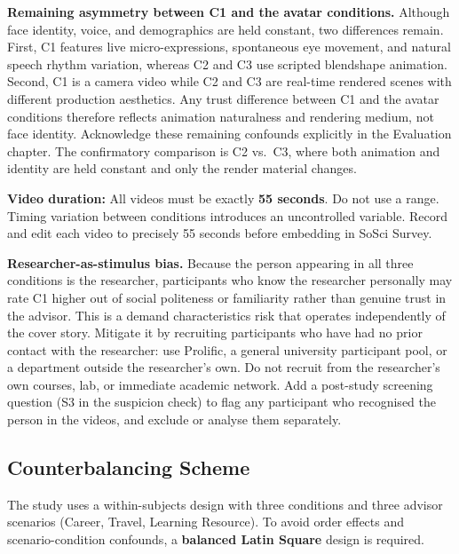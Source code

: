\documentclass[11pt, a4paper]{article}
\begin{document}
\begin{warnbox}
\small\textbf{Remaining asymmetry between C1 and the avatar conditions.} Although face identity, voice, and demographics are held constant, two differences remain. First, C1 features live micro-expressions, spontaneous eye movement, and natural speech rhythm variation, whereas C2 and C3 use scripted blendshape animation. Second, C1 is a camera video while C2 and C3 are real-time rendered scenes with different production aesthetics. Any trust difference between C1 and the avatar conditions therefore reflects animation naturalness and rendering medium, not face identity. Acknowledge these remaining confounds explicitly in the Evaluation chapter. The confirmatory comparison is C2 vs.\ C3, where both animation and identity are held constant and only the render material changes.
\end{warnbox}

\textbf{Video duration:} All videos must be exactly \textbf{55 seconds}. Do not use a range. Timing variation between conditions introduces an uncontrolled variable. Record and edit each video to precisely 55 seconds before embedding in SoSci Survey.

\begin{warnbox}
\small\textbf{Researcher-as-stimulus bias.} Because the person appearing in all three conditions is the researcher, participants who know the researcher personally may rate C1 higher out of social politeness or familiarity rather than genuine trust in the advisor. This is a demand characteristics risk that operates independently of the cover story. Mitigate it by recruiting participants who have had no prior contact with the researcher: use Prolific, a general university participant pool, or a department outside the researcher's own. Do not recruit from the researcher's own courses, lab, or immediate academic network. Add a post-study screening question (S3 in the suspicion check) to flag any participant who recognised the person in the videos, and exclude or analyse them separately.
\end{warnbox}

\subsection{Counterbalancing Scheme}

The study uses a within-subjects design with three conditions and three advisor scenarios (Career, Travel, Learning Resource). To avoid order effects and scenario-condition confounds, a \textbf{balanced Latin Square} design is required.
\end{document}
